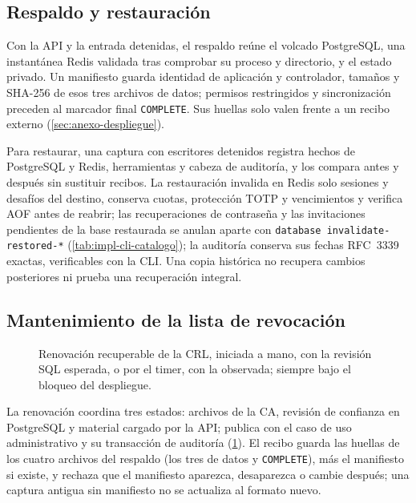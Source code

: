 \subsection{Respaldo y restauración}

Con la API y la entrada detenidas, el respaldo reúne el volcado PostgreSQL, una instantánea Redis validada tras comprobar su proceso y directorio, y el estado privado. Un manifiesto guarda identidad de aplicación y controlador, tamaños y SHA-256 de esos tres archivos de datos; permisos restringidos y sincronización preceden al marcador final \texttt{COMPLETE}. Sus huellas solo valen frente a un recibo externo (\cref{sec:anexo-despliegue}).

Para restaurar, una captura con escritores detenidos registra hechos de PostgreSQL y Redis, herramientas y cabeza de auditoría, y los compara antes y después sin sustituir recibos. La restauración invalida en Redis solo sesiones y desafíos del destino, conserva cuotas, protección TOTP y vencimientos y verifica AOF antes de reabrir; las recuperaciones de contraseña y las invitaciones pendientes de la base restaurada se anulan aparte con \texttt{database invalidate-restored-*} (\cref{tab:impl-cli-catalogo}); la auditoría conserva sus fechas RFC~3339 exactas, verificables con la CLI. Una copia histórica no recupera cambios posteriores ni prueba una recuperación integral.

\subsection{Mantenimiento de la lista de revocación}

\begin{figure}[!tb]
  \centering
  
  \caption{Renovación recuperable de la CRL, iniciada a mano, con la revisión SQL esperada, o por el timer, con la observada; siempre bajo el bloqueo del despliegue.}
  \label{fig:impl-crl-mantenimiento}
\end{figure}

La renovación coordina tres estados: archivos de la CA, revisión de confianza en PostgreSQL y material cargado por la API; publica con el caso de uso administrativo y su transacción de auditoría (\cref{fig:impl-crl-mantenimiento}). El recibo guarda las huellas de los cuatro archivos del respaldo (los tres de datos y \texttt{COMPLETE}), más el manifiesto si existe, y rechaza que el manifiesto aparezca, desaparezca o cambie después; una captura antigua sin manifiesto no se actualiza al formato nuevo.

